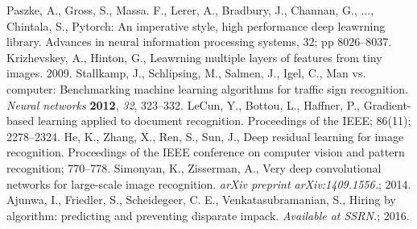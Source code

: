 \documentclass[symmetry,article,submit,moreauthors,pdftex]{Definitions/mdpi}
\begin{document}
\begin{thebibliography}{999}
Paszke, A., Gross, S., Massa. F., Lerer, A., Bradbury, J., Channan, G., ..., Chintala, S., Pytorch: An imperative style, high performance deep leawrning library. Advances in neural information processing systems, 32; pp 8026--8037.
Krizhevskey, A., Hinton, G., Leawrning multiple layers of features from tiny images. 2009.
Stallkamp, J., Schlipsing, M., Salmen, J., Igel, C., Man vs. computer: Benchmarking machine learning algorithms for traffic sign recognition. {\em Neural networks} {\bf 2012}, {\em 32}, 323--332.
LeCun, Y., Bottou, L., Haffner, P., Gradient-based learning applied to document recognition. Proceedings of the IEEE; 86(11); 2278--2324.
He, K., Zhang, X., Ren, S., Sun, J., Deep residual learning for image recognition. Proceedings of the IEEE conference on computer vision and pattern recognition; 770--778.
Simonyan, K., Zisserman, A., Very deep convolutional networks for large-scale image recognition. \textit{arXiv preprint arXiv:1409.1556.}; 2014.
Ajunwa, I., Friedler, S., Scheidegeer, C. E., Venkatasubramanian, S., Hiring by algorithm: predicting and preventing disparate impack. \textit{Available at SSRN.}; 2016.
\end{thebibliography}
\end{document}
